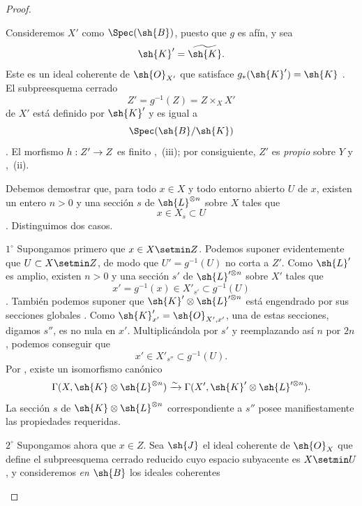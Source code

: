 \documentclass[oneside]{amsart}
\makeatletter
\newcommand{\ega@arrow}[2]{\mathchoice{#1}{#2}{#2}{#2}}
\renewcommand{\to}{\ega@arrow{\longrightarrow}{\rightarrow}}
\newcommand{\oldpage}[2][]{{\marginnote{\normalfont\textbf{#1}~|~#2}}\ignorespaces}
\let\EGAOriginalLabel\label
\renewcommand{\label}[1]{\phantomsection\EGAOriginalLabel{#1}}
\makeatother
\begin{document}
\begin{proof}
\begin{env}[2.6.2.5]
\label{III.2.6.2.5}
Consideremos $X'$ como $\Spec(\sh{B})$, puesto que $g$ es afín, y sea
\[
  \sh{K}'=\widetilde{\sh{K}}.
\]
Este es un ideal coherente de $\sh{O}_{X'}$ que satisface
$g_*(\sh{K}')=\sh{K}$ .
El subpreesquema cerrado
\[
  Z'=g^{-1}(Z)=Z\times_X X'
\]
de $X'$ está definido por $\sh{K}'$ y es igual a
\[
  \Spec(\sh{B}/\sh{K})
\]
.
El morfismo $h:Z'\to Z$ es finito ,~(iii);
por consiguiente, $Z'$ es \emph{propio} sobre $Y$  y
,~(ii).

Debemos demostrar que, para todo $x\in X$ y todo entorno abierto $U$
de $x$, existen un entero $n>0$ y una sección $s$ de
$\sh{L}^{\otimes n}$ sobre $X$ tales que
\[
  x\in X_s\subset U
\]
.
Distinguimos dos casos.

\smallskip
\noindent
$1^\circ$ Supongamos primero que $x\in X\setmin Z$.
Podemos suponer evidentemente que $U\subset X\setmin Z$, de modo que
$U'=g^{-1}(U)$ no corta a $Z'$.
Como $\sh{L}'$ es amplio, existen $n>0$ y una sección $s'$ de
$\sh{L}'^{\otimes n}$ sobre $X'$ tales que
\[
  x'=g^{-1}(x)\in X'_{s'}\subset g^{-1}(U)
\]
.
También podemos suponer que
$\sh{K}'\otimes\sh{L}'^{\otimes n}$ está engendrado por sus secciones globales
.
Como $\sh{K}'_{x'}=\sh{O}_{X',x'}$, una de estas secciones, digamos $s''$, es
no nula en $x'$.
Multiplicándola por $s'$ y reemplazando así $n$ por $2n$, podemos conseguir
que
\[
  x'\in X'_{s''}\subset g^{-1}(U).
\]
Por , existe un isomorfismo canónico
\[
  \Gamma(X,\sh{K}\otimes\sh{L}^{\otimes n})
  \xrightarrow{\sim}
  \Gamma(X',\sh{K}'\otimes\sh{L}'^{\otimes n}).
\]
La sección $s$ de $\sh{K}\otimes\sh{L}^{\otimes n}$ correspondiente a
$s''$ posee manifiestamente las propiedades requeridas.

\smallskip
\noindent
$2^\circ$ Supongamos ahora que $x\in Z$.
Sea $\sh{J}$ el ideal coherente de $\sh{O}_X$ que define el
subpreesquema cerrado reducido cuyo espacio subyacente es $X\setmin U$, y consideremos \emph{en}
$\sh{B}$ los ideales coherentes

\oldpage[III]{114}


\end{env}
\end{proof}
\end{document}
